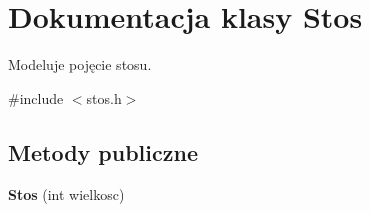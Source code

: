 \hypertarget{class_stos}{\section{\-Dokumentacja klasy \-Stos}
\label{class_stos}
}


\-Modeluje pojęcie stosu.  




{\ttfamily \#include $<$stos.\-h$>$}

\subsection*{\-Metody publiczne}
\begin{DoxyCompactItemize}
\item 
\hypertarget{class_stos_a7fed965e5a913950f4d213143bb1671f}{{\bfseries \-Stos} (int wielkosc)}\label{class_stos_a7fed965e5a913950f4d213143bb1671f}


\end{DoxyCompactItemize}
